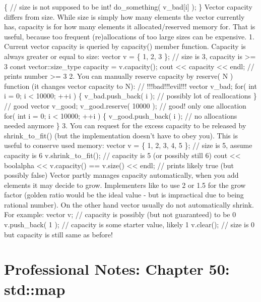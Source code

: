 \{ // size is not supposed to be int! do\_something( v\_bad{[}i{]} ); \}
Vector capacity diﬀers from size. While size is simply how many elements
the vector currently has, capacity is for how many elements it
allocated/reserved memory for. That is useful, because too frequent
(re)allocations of too large sizes can be expensive. 1. Current vector
capacity is queried by capacity() member function. Capacity is always
greater or equal to size: vector v = \{ 1, 2, 3 \}; // size is 3,
capacity is \textgreater= 3 const vector::size\_type capacity =
v.capacity(); cout \textless\textless{} capacity \textless\textless{}
endl; // prints number \textgreater= 3 2. You can manually reserve
capacity by reserve( N ) function (it changes vector capacity to N): //
!!!bad!!!evil!!! vector v\_bad; for( int i = 0; i \textless{} 10000; ++i
) \{ v\_bad.push\_back( i ); // possibly lot of reallocations \} // good
vector v\_good; v\_good.reserve( 10000 ); // good! only one allocation
for( int i = 0; i \textless{} 10000; ++i ) \{ v\_good.push\_back( i );
// no allocations needed anymore \} 3. You can request for the excess
capacity to be released by shrink\_to\_fit() (but the implementation
doesn't have to obey you). This is useful to conserve used memory:
vector v = \{ 1, 2, 3, 4, 5 \}; // size is 5, assume capacity is 6
v.shrink\_to\_fit(); // capacity is 5 (or possibly still 6) cout
\textless\textless{} boolalpha \textless\textless{} v.capacity() ==
v.size() \textless\textless{} endl; // prints likely true (but possibly
false) Vector partly manages capacity automatically, when you add
elements it may decide to grow. Implementers like to use 2 or 1.5 for
the grow factor (golden ratio would be the ideal value - but is
impractical due to being rational number). On the other hand vector
usually do not automatically shrink. For example: vector v; // capacity
is possibly (but not guaranteed) to be 0 v.push\_back( 1 ); // capacity
is some starter value, likely 1 v.clear(); // size is 0 but capacity is
still same as before!

\hypertarget{professional-notes-chapter-50-stdmap-1}{%
\chapter{Professional Notes: Chapter 50:
std::map}\label{professional-notes-chapter-50-stdmap-1}}

